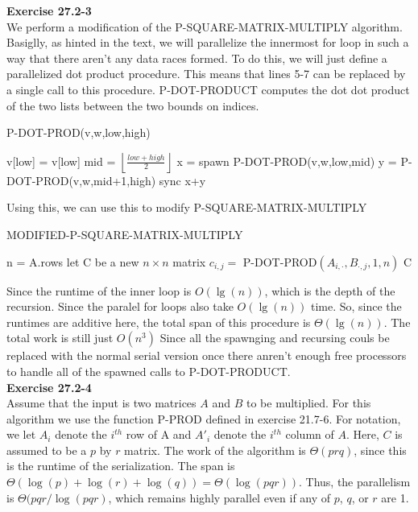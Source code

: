 \documentclass{article}
\begin{document}
\noindent\textbf{Exercise 27.2-3}\\

We perform a modification of the P-SQUARE-MATRIX-MULTIPLY algorithm. Basiglly, as hinted in the text, we will parallelize the innermost for loop in such a way that there aren't any data races formed. To do this, we will just define a parallelized dot product procedure. This means that lines 5-7 can be replaced by a single call to this procedure. P-DOT-PRODUCT computes the dot dot product of the two lists between the two bounds on indices.

\begin{algorithm}
\caption{P-DOT-PROD(v,w,low,high)}
\begin{algorithmic}
\State \Return  v[low] = v[low]
\EndIf
\State mid = $\left\lfloor \frac{low+high}{2}\right\rfloor$
\State x = spawn P-DOT-PROD(v,w,low,mid)
\State y = P-DOT-PROD(v,w,mid+1,high)
\State sync
\State \Return x+y
\end{algorithmic}
\end{algorithm}

Using this, we can use this to modify P-SQUARE-MATRIX-MULTIPLY

\begin{algorithm}
\caption{MODIFIED-P-SQUARE-MATRIX-MULTIPLY}
\begin{algorithmic}
\State n = A.rows
\State let C be a new $n\times n$ matrix
\State $c_{i,j} =$ P-DOT-PROD$(A_{i,\cdot},B_{\cdot,j},1,n)$
\EndParFor
\EndParFor
\State \Return C
\end{algorithmic}
\end{algorithm}

Since the runtime of the inner loop is $O(\lg(n))$, which is the depth of the recursion. Since the paralel for loops also take $O(\lg(n))$ time. So, since the runtimes are additive here, the total span of this procedure is $\Theta(\lg(n))$. The total work is still just $O(n^3)$ Since all the spawnging and recursing couls be replaced with the normal serial version once there anren't enough free processors to handle all of the spawned calls to P-DOT-PRODUCT. \\

\noindent\textbf{Exercise 27.2-4}\\

Assume that the input is two matrices $A$ and $B$ to be multiplied.  For this algorithm we use the function P-PROD defined in exercise 21.7-6.  For notation, we let $A_i$ denote the $i^{th}$ row of A and $A'_i$ denote the $i^{th}$ column of $A$.  Here, $C$ is assumed to be a $p$ by $r$ matrix. The work of the algorithm is $\Theta(prq)$, since this is the runtime of the serialization.  The span is $\Theta(\log(p) + \log(r) + \log(q)) = \Theta(\log(pqr))$.  Thus, the parallelism is $ \Theta(pqr / \log(pqr)$, which remains highly parallel even if any of $p$, $q$, or $r$ are 1.\\
\end{document}
